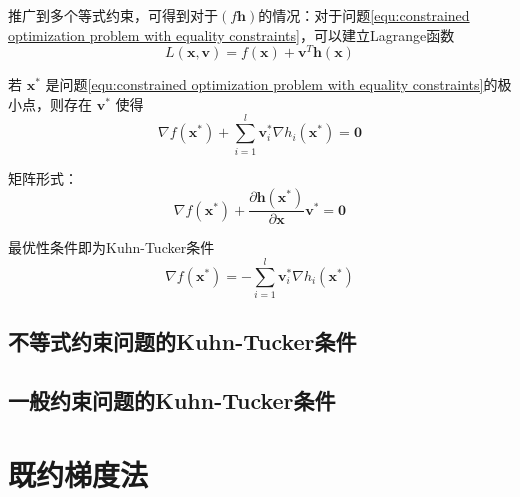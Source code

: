 \documentclass{book}
\begin{document}
推广到多个等式约束，可得到对于$(f\boldsymbol{h})$的情况：对于问题\ref{equ:constrained optimization problem with equality constraints}，可以建立Lagrange函数
\begin{equation}
    L(\boldsymbol{x},\boldsymbol{v})=f(\boldsymbol{x})+\boldsymbol{v}^T\boldsymbol{h}(\boldsymbol{x})
    \label{equ:Lagrange function}
\end{equation}

若 $\boldsymbol{x}^*$ 是问题\ref{equ:constrained optimization problem with equality constraints}的极小点，则存在 $\boldsymbol{v}^*$ 使得
\begin{equation}
    \nabla f(\boldsymbol{x}^*)+\sum_{i=1}^{l}\boldsymbol{v}_i^*\nabla h_i(\boldsymbol{x}^*)=\boldsymbol{0}
\end{equation}

矩阵形式：
\begin{equation}
    \nabla f(\boldsymbol{x}^*)+\frac{\partial\boldsymbol{h}(\boldsymbol{x}^*)}{\partial\boldsymbol{x}}\boldsymbol{v}^*=\boldsymbol{0}
\end{equation}

最优性条件即为Kuhn-Tucker条件
\begin{equation}
    \nabla f(\boldsymbol{x}^*) = -\sum_{i=1}^{l}\boldsymbol{v}_i^*\nabla h_i(\boldsymbol{x}^*)
    \label{equ:Kuhn-Tucker condition}
\end{equation}

\subsection{不等式约束问题的Kuhn-Tucker条件}

\subsection{一般约束问题的Kuhn-Tucker条件}

\section{既约梯度法}
\end{document}
